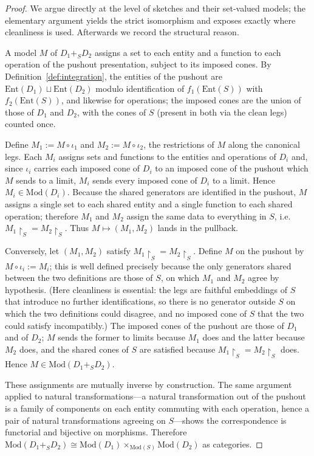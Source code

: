 \documentclass[11pt]{article}
\theoremstyle{plain}
\theoremstyle{definition}
\newcommand{\Mod}{\mathrm{Mod}}
\newcommand{\restrict}[1]{\!\!\upharpoonright_{#1}}
\begin{document}
\begin{proof}
We argue directly at the level of sketches and their set-valued models; the elementary argument yields the strict isomorphism and exposes exactly where cleanliness is used. Afterwards we record the structural reason.

A model $M$ of $D_1 +_S D_2$ assigns a set to each entity and a function to each operation of the pushout presentation, subject to its imposed cones. By Definition~\ref{def:integration}, the entities of the pushout are $\mathrm{Ent}(D_1)\sqcup\mathrm{Ent}(D_2)$ modulo identification of $f_1(\mathrm{Ent}(S))$ with $f_2(\mathrm{Ent}(S))$, and likewise for operations; the imposed cones are the union of those of $D_1$ and $D_2$, with the cones of $S$ (present in both via the clean legs) counted once.

Define $M_1 := M\circ\iota_1$ and $M_2 := M\circ\iota_2$, the restrictions of $M$ along the canonical legs. Each $M_i$ assigns sets and functions to the entities and operations of $D_i$ and, since $\iota_i$ carries each imposed cone of $D_i$ to an imposed cone of the pushout which $M$ sends to a limit, $M_i$ sends every imposed cone of $D_i$ to a limit. Hence $M_i \in \Mod(D_i)$. Because the shared generators are identified in the pushout, $M$ assigns a single set to each shared entity and a single function to each shared operation; therefore $M_1$ and $M_2$ assign the same data to everything in $S$, i.e.\ $M_1\restrict{S} = M_2\restrict{S}$. Thus $M \mapsto (M_1,M_2)$ lands in the pullback.

Conversely, let $(M_1,M_2)$ satisfy $M_1\restrict{S}=M_2\restrict{S}$. Define $M$ on the pushout by $M\circ\iota_i := M_i$; this is well defined precisely because the only generators shared between the two definitions are those of $S$, on which $M_1$ and $M_2$ agree by hypothesis. (Here cleanliness is essential: the legs are faithful embeddings of $S$ that introduce no further identifications, so there is no generator outside $S$ on which the two definitions could disagree, and no imposed cone of $S$ that the two could satisfy incompatibly.) The imposed cones of the pushout are those of $D_1$ and of $D_2$; $M$ sends the former to limits because $M_1$ does and the latter because $M_2$ does, and the shared cones of $S$ are satisfied because $M_1\restrict{S}=M_2\restrict{S}$ does. Hence $M\in\Mod(D_1+_S D_2)$.

These assignments are mutually inverse by construction. The same argument applied to natural transformations---a natural transformation out of the pushout is a family of components on each entity commuting with each operation, hence a pair of natural transformations agreeing on $S$---shows the correspondence is functorial and bijective on morphisms. Therefore $\Mod(D_1+_S D_2)\cong \Mod(D_1)\times_{\Mod(S)}\Mod(D_2)$ as categories.
\end{proof}
\end{document}
